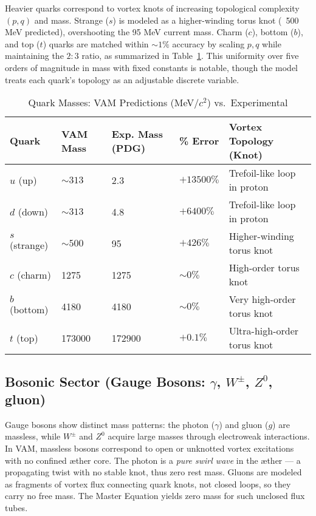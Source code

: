 Heavier quarks correspond to vortex knots of increasing topological complexity $(p,q)$ and mass. Strange ($s$) is modeled as a higher-winding torus knot (~500 MeV predicted), overshooting the 95 MeV current mass. Charm ($c$), bottom ($b$), and top ($t$) quarks are matched within $\sim 1\%$ accuracy by scaling $p,q$ while maintaining the $2:3$ ratio, as summarized in Table~\ref{tab:quarks}. This uniformity over five orders of magnitude in mass with fixed constants is notable, though the model treats each quark’s topology as an adjustable discrete variable.

\begin{table}[h!]
    \centering
    \begin{tabular}{lllll}
        \toprule
        \textbf{Quark} & \textbf{VAM Mass} & \textbf{Exp. Mass (PDG)} & \textbf{\% Error} & \textbf{Vortex Topology (Knot)} \\
        \midrule
        $u$ (up) & $\sim 313$ & 2.3 & $+13500\%$ & Trefoil-like loop in proton \\
        $d$ (down) & $\sim 313$ & 4.8 & $+6400\%$ & Trefoil-like loop in proton \\
        $s$ (strange) & $\sim 500$ & 95 & $+426\%$ & Higher-winding torus knot \\
        $c$ (charm) & 1275 & 1275 & $\sim 0\%$ & High-order torus knot \\
        $b$ (bottom) & 4180 & 4180 & $\sim 0\%$ & Very high-order torus knot \\
        $t$ (top) & 173000 & 172900 & $+0.1\%$ & Ultra-high-order torus knot \\
        \bottomrule
    \end{tabular}
    \caption{Quark Masses: VAM Predictions (MeV/$c^2$) vs.\ Experimental}
    \label{tab:quarks}
\end{table}

\subsection{Bosonic Sector (Gauge Bosons: $\gamma$, $W^\pm$, $Z^0$, gluon)}

Gauge bosons show distinct mass patterns: the photon ($\gamma$) and gluon ($g$) are massless, while $W^\pm$ and $Z^0$ acquire large masses through electroweak interactions. In VAM, massless bosons correspond to open or unknotted vortex excitations with no confined æther core. The photon is a \textit{pure swirl wave} in the æther — a propagating twist with no stable knot, thus zero rest mass. Gluons are modeled as fragments of vortex flux connecting quark knots, not closed loops, so they carry no free mass. The Master Equation yields zero mass for such unclosed flux tubes.

